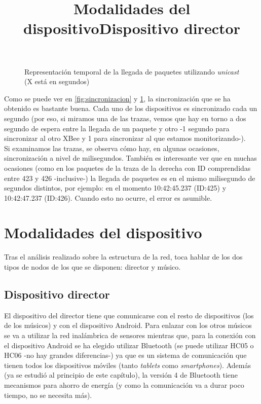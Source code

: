 \begin{figure}[!htb]
{
  }


  \caption{Representación temporal de la llegada de paquetes utilizando \textit{unicast}\\
  (X está en segundos)} \label{fig:graficasincronizados}
  \end{figure}

Como se puede ver en \ref{fig:sincronizacion} y \ref{fig:graficasincronizados},
la sincronización que se ha obtenido es bastante buena. Cada uno de los dispositivos
es sincronizado cada un segundo (por eso, si miramos una de las trazas,
vemos que hay en torno a dos segundo de espera entre la llegada de un paquete y otro
-1 segundo para sincronizar al otro XBee y 1 para sincronizar al que estamos monitorizando-).\\

Si examinamos las trazas, se observa cómo hay, en algunas ocasiones, sincronización
a nivel de milisegundos. También es interesante ver que en muchas ocasiones (como en los
paquetes de la traza de la derecha con ID comprendidas entre 423 y 426 -inclusive-) la
llegada de paquetes es en el mismo milisegundo de segundos distintos, por ejemplo: en el
momento 10:42:45.237 (ID:425) y 10:42:47.237 (ID:426). Cuando esto no ocurre, el error es asumible.\\



\section{Modalidades del dispositivo}
\title{Modalidades del dispositivo}

Tras el análisis realizado sobre la estructura de la red, toca hablar de los dos tipos
de nodos de los que se disponen: director y músico.

\subsection{Dispositivo director}
\title{Dispositivo director}

El dispositivo del director tiene que comunicarse con el resto de dispositivos (los
de los músicos) y con el dispositivo Android. Para enlazar con los otros músicos
se va a utilizar la red inalámbrica de sensores mientras que, para la conexión
con el dispositivo Android se ha elegido utilizar Bluetooth (se puede utilizar HC05 \cite{bthc05} o HC06 -no hay grandes
diferencias-) ya que es un sistema de comunicación que tienen todos los dispositivos móviles (tanto \textit{tablets} como
\textit{smartphones}). Además (ya se estudió al principio de este capítulo), la versión
4 de Bluetooth tiene mecanismos para ahorro de energía (y como la comunicación va a durar
poco tiempo, no se necesita más).\\


